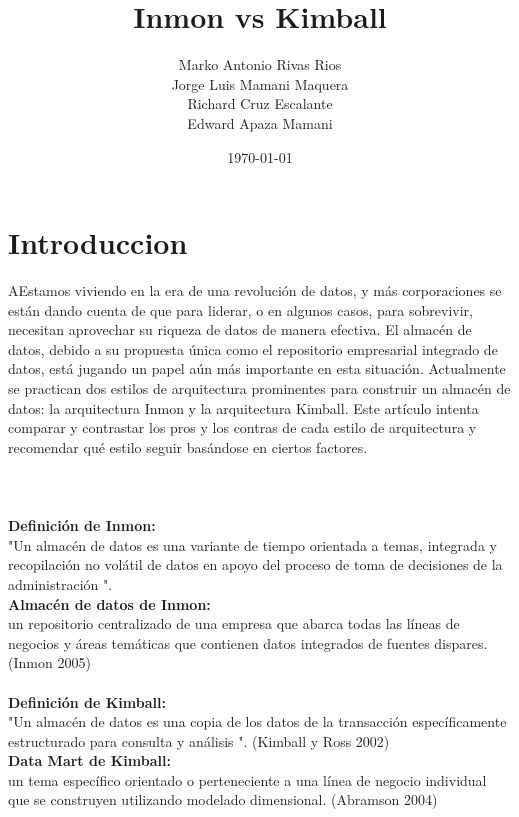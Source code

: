 \documentclass[twoside,twocolumn]{article}
\title{Inmon vs Kimball}
\author{Marko Antonio Rivas Rios\\  Jorge Luis Mamani Maquera\\  Richard Cruz Escalante \\ Edward Apaza Mamani
}
\date{\today}
\begin{document}
\maketitle


\section{Introduccion}
\lettrine[nindent=0em,lines=3]{A}Estamos viviendo en la era de una revolución de datos, y más corporaciones se están dando cuenta de que para liderar, o en algunos casos, para sobrevivir, necesitan aprovechar su riqueza de datos de manera efectiva.
El almacén de datos, debido a su propuesta única como el repositorio empresarial integrado de datos, está jugando un papel aún más importante en esta situación. Actualmente se practican dos estilos de arquitectura prominentes para construir un almacén de datos: la arquitectura Inmon y la arquitectura Kimball.
Este artículo intenta comparar y contrastar los pros y los contras de cada estilo de arquitectura y recomendar qué estilo seguir basándose en ciertos factores.\textbf{}\\
\textbf{}\\
\textbf{}\\
\textbf{}\\
\textbf{Definición de Inmon: }\\
"Un almacén de datos es una variante de tiempo orientada a temas, integrada y
recopilación no volátil de datos en apoyo del proceso de toma de decisiones de la administración ".
\textbf{}\\
\textbf{Almacén de datos de Inmon: }\\
un repositorio centralizado de una empresa que abarca todas las líneas
de negocios y áreas temáticas que contienen datos integrados de fuentes dispares.
(Inmon 2005)
\textbf{}\\
\textbf{}\\
\textbf{Definición de Kimball:}\\
 "Un almacén de datos es una copia de los datos de la transacción específicamente
estructurado para consulta y análisis ". (Kimball y Ross 2002)\textbf{}\\
\textbf{Data Mart de Kimball: }\\
un tema específico orientado o perteneciente a una línea de negocio individual
que se construyen utilizando modelado dimensional. (Abramson 2004)
\end{document}

